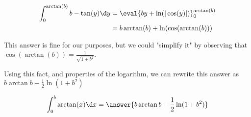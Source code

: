 \documentclass{ximera}
\begin{document}
\begin{exercise}
\begin{hint}
	
	\begin{align*}
		\int_{0}^{\arctan(b)} b - \tan(y) \d y &=  \eval{b y + \ln(|\cos(y)|)}_0^{\arctan(b)}\\
		&= b\arctan(b) + \ln(\cos(\arctan(b)))
	\end{align*}

This answer is fine for our purposes, but we could "simplify it" by observing that $\cos(\arctan(b)) = \frac{1}{\sqrt{1+b^2}}$.

Using this fact, and properties of the logarithm, we can rewrite this answer as $b\arctan{b}-\frac{1}{2} \ln(1+b^2)$
	
\end{hint}

\begin{prompt}
	\[
		\int_0^b \arctan(x) \d x = \answer{b\arctan{b}-\frac{1}{2} \ln(1+b^2)}
	\]

\end{prompt}

\end{exercise}
\end{document}
